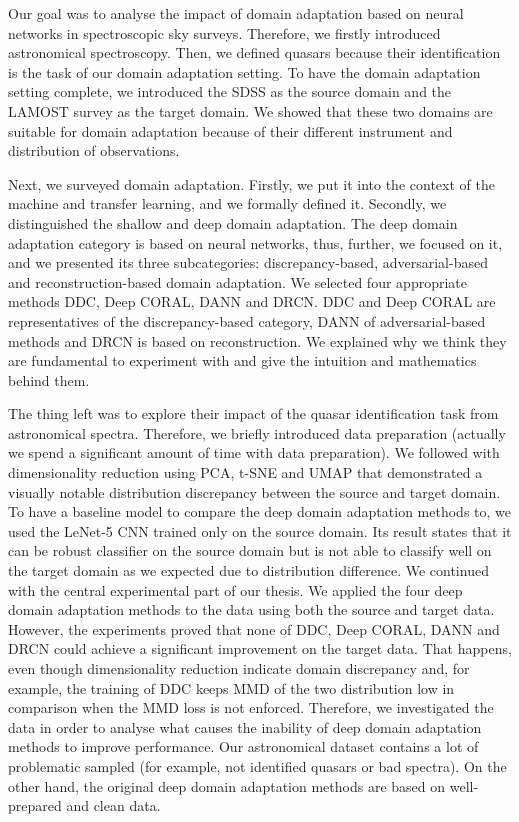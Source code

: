 \documentclass[thesis=M,english]{FITthesis}[2012/10/20]
\begin{document}
Our goal was to analyse the impact of domain adaptation based on neural networks in spectroscopic sky surveys.
Therefore, we firstly introduced astronomical spectroscopy.
Then, we defined quasars because their identification is the task of our domain adaptation setting.
To have the domain adaptation setting complete,
we introduced the SDSS as the source domain and the LAMOST survey as the target domain.
We showed that these two domains are suitable for domain adaptation
because of their different instrument and distribution of observations.

Next, we surveyed domain adaptation.
Firstly, we put it into the context of the machine and transfer learning,
and we formally defined it.
Secondly, we distinguished the shallow and deep domain adaptation.
The deep domain adaptation category is based on neural networks,
thus, further, we focused on it, and we presented its three subcategories:
discrepancy-based, adversarial-based and reconstruction-based domain adaptation.
We selected four appropriate methods DDC, Deep CORAL, DANN and DRCN.
DDC and Deep CORAL are representatives of the discrepancy-based category, DANN of adversarial-based methods and DRCN is based on reconstruction.
We explained why we think they are fundamental to experiment with
and give the intuition and mathematics behind them.

The thing left was to explore their impact of the quasar identification task from astronomical spectra.
Therefore, we briefly introduced data preparation
(actually we spend a significant amount of time with data preparation).
We followed with dimensionality reduction using PCA, t-SNE and UMAP
that demonstrated a visually notable distribution discrepancy between the source and target domain.
To have a baseline model to compare the deep domain adaptation methods to,
we used the LeNet-5 CNN trained only on the source domain.
Its result states that it can be robust classifier on the source domain
but is not able to classify well on the target domain as we expected due to distribution difference.
We continued with the central experimental part of our thesis.
We applied the four deep domain adaptation methods to the data using both the source and target data.
However, the experiments proved that none of DDC, Deep CORAL, DANN and DRCN could achieve a significant improvement on the target data.
That happens, even though dimensionality reduction indicate domain discrepancy
and, for example, the training of DDC keeps MMD of the two distribution low in comparison when the MMD loss is not enforced.
Therefore, we investigated the data in order to analyse
what causes the inability of deep domain adaptation methods to improve performance.
Our astronomical dataset contains a lot of problematic sampled
(for example, not identified quasars or bad spectra).
On the other hand, the original deep domain adaptation methods are based on well-prepared and clean data.
\end{document}
